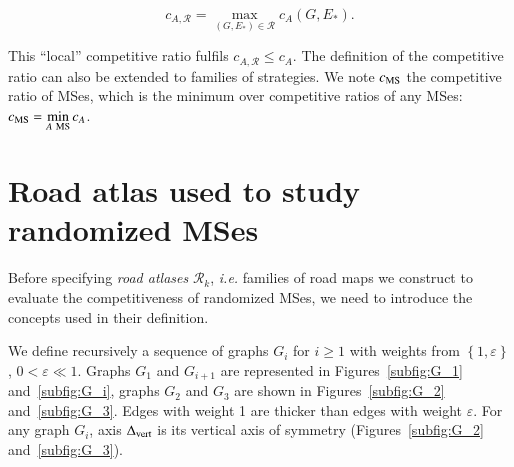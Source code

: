 \documentclass[preprint]{elsarticle}
\newcommand{\set}[1]{\left\{ #1 \right\}}
\newcommand{\mcalg}{\mathcal{G}}
\newcommand{\mcalr}{\mathcal{R}}
\newcommand{\mts}{MS}
\newcommand{\deltavert}{\Delta_{\mbox{\scriptsize{vert}}}}
\newcommand{\cms}{c_{\mbox{\scriptsize{MS}}}}
\begin{document}
\begin{equation}
c_{A,\mathcal{R}} = \max\limits_{\left(G,E_*\right) \in \mathcal{R}} c_A\left(G,E_*\right).
\end{equation}

This ``local'' competitive ratio fulfils $c_{A,\mathcal{R}} \le c_A$. The definition of the competitive ratio can also be extended to families of strategies. We note $\cms$ the competitive ratio of \mts es, which is the minimum over competitive ratios of any \mts es: $\cms = \min\limits_{A ~\mbox{\scriptsize{\mts}}} c_A$. 
\section{Road atlas used to study randomized \mts es} \label{sec:roadatlas}

Before specifying \textit{road atlases} $\mcalr_k$, {\em i.e.} families of road maps we construct to evaluate the competitiveness of randomized \mts es, we need to introduce the concepts used in their definition.


We define recursively a sequence of graphs $G_i$ for $i \geq 1$ with weights from $\set{1,\varepsilon}$, $0 < \varepsilon \ll 1$. Graphs $G_1$ and $G_{i+1}$ are represented in Figures~\ref{subfig:G_1} and~\ref{subfig:G_i}, graphs $G_2$ and $G_3$ are shown in Figures~\ref{subfig:G_2} and~\ref{subfig:G_3}. Edges with weight 1 are thicker than edges with weight $\varepsilon$. For any graph $G_i$, axis $\deltavert$ is its vertical axis of symmetry (Figures~\ref{subfig:G_2} and~\ref{subfig:G_3}).

\end{document}
